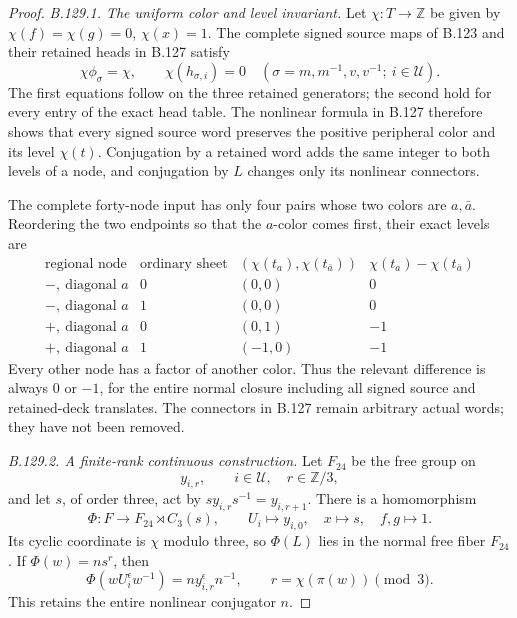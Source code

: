 \begin{proof}
\emph{B.129.1. The uniform color and level invariant.}
Let \(\chi:T\to\mathbb Z\) be given by
\(\chi(f)=\chi(g)=0\), \(\chi(x)=1\). The complete signed source
maps of B.123 and their retained heads in B.127 satisfy
\begin{equation}\label{eq:B129-level-invariant}
 \chi\phi_\sigma=\chi,\qquad
 \chi(h_{\sigma,i})=0
 \quad(\sigma=m,m^{-1},v,v^{-1};\ i\in\mathcal U).
\end{equation}
The first equations follow on the three retained generators;
the second hold for every entry of the exact head table.
The nonlinear formula in B.127 therefore shows that every
signed source word preserves the positive peripheral color
and its level \(\chi(t)\). Conjugation by a retained word
adds the same integer to both levels of a node, and conjugation
by \(L\) changes only its nonlinear connectors.

The complete forty-node input has only four pairs whose two
colors are \(a,\bar a\). Reordering the two endpoints so that
the \(a\)-color comes first, their exact levels are
\[
\begin{array}{c|c|c|c}
 \text{regional node}&\text{ordinary sheet}&
    (\chi(t_a),\chi(t_{\bar a}))&
       \chi(t_a)-\chi(t_{\bar a})\\ \hline
 -,\ \text{diagonal }a&0&(0,0)&0\\
 -,\ \text{diagonal }a&1&(0,0)&0\\
 +,\ \text{diagonal }a&0&(0,1)&-1\\
 +,\ \text{diagonal }a&1&(-1,0)&-1
\end{array}
\]
Every other node has a factor of another color. Thus the
relevant difference is always \(0\) or \(-1\), for the entire
normal closure including all signed source and retained-deck
translates. The connectors in B.127 remain arbitrary actual
words; they have not been removed.

\emph{B.129.2. A finite-rank continuous construction.}
Let \(F_{24}\) be the free group on
\[
 y_{i,r},\qquad i\in\mathcal U,\quad r\in\mathbb Z/3,
\]
and let \(s\), of order three, act by
\(sy_{i,r}s^{-1}=y_{i,r+1}\). There is a homomorphism
\begin{equation}\label{eq:B129-Phi}
 \Phi:F\longrightarrow F_{24}\rtimes C_3(s),\qquad
 U_i\mapsto y_{i,0},\quad x\mapsto s,\quad f,g\mapsto1.
\end{equation}
Its cyclic coordinate is \(\chi\) modulo three, so \(\Phi(L)\)
lies in the normal free fiber \(F_{24}\). If
\(\Phi(w)=ns^r\), then
\[
 \Phi(wU_i^\epsilon w^{-1})
     =n y_{i,r}^{\epsilon}n^{-1},\qquad
 r=\chi(\pi(w))\pmod3.
\]
This retains the entire nonlinear conjugator \(n\).


\end{proof}
